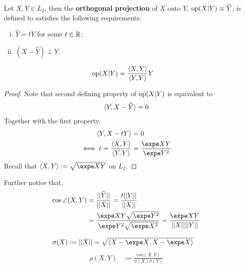 \documentclass{article}
\begin{document}
   	\begin{definition}
   		Let $X, Y \in L_2$, then the \textbf{orthogonal projection} of $X$ onto $Y$, $\text{{op}}(X|Y) \equiv \widehat{Y}$, is defined to satisfies the following requirements:
   		\begin{enumerate}[(i)]
   			\item $\widehat{Y} = t Y$ for some $t \in \mathbb{R}$;
   			\item $(X - \widehat{Y}) \perp Y$.
   		\end{enumerate}
   	\end{definition}
   	   	
   	\begin{proposition}
   		\begin{align}
   			\text{{op}}(X|Y) &= \frac{\langle {X}, {Y} \rangle}{\langle {Y}, {Y} \rangle} Y
   		\end{align}
   	\end{proposition}

   	\begin{proof}
   		Note that second defining property of $\text{{op}}(X|Y)$ is equivalent to
   		\begin{align}
   			\langle {Y}, {X - \widehat{Y}} \rangle = 0
   		\end{align}
   		Together with the first property,
   		\begin{align}
   			\inner{Y}{X - t Y} &= 0 \\
   			\iff t = \frac{\inner{X}{Y}}{\inner{Y}{Y}} &= \frac{\expe XY}{\expe Y^2}
   		\end{align}
   		Recall that $\inner{X}{Y} := \sqrt{\expe XY}$ on $L_2$.
   	\end{proof}
   	
   	\begin{proposition}
   		Further notice that, 
   		\begin{align}
   			\cos \angle (X, Y)
   			&= \frac{\norm{\widehat{Y}}}{\norm{X}}
   			= \frac{t\norm{Y}}{\norm{X}}
   			\\
   			&= \frac{\expe XY \sqrt{\expe Y^2}}{\expe Y^2 \sqrt{\expe X^2}}
   			= \frac{\expe XY}{\norm{X} \norm{Y}}
   		\end{align}
   	\end{proposition}
	
	\begin{definition}
		\begin{align}
			\sigma(X) &:= \norm{\dot{X}} = \sqrt{\inner{X - \expe X}{X - \expe X}}
		\end{align}
		\begin{align}
			\rho(X, Y) &:= \frac{cov(X, Y)}{\sigma(X) \sigma(Y)}
		\end{align}
	\end{definition}
   	
\end{document}
